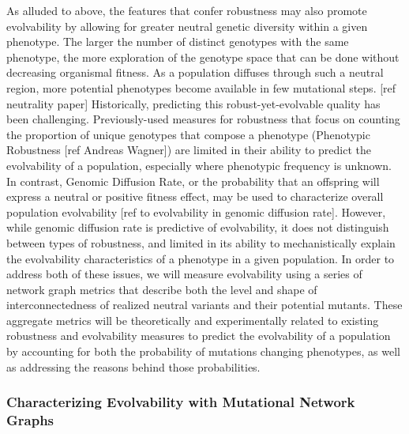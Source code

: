 As alluded to above, the features that confer robustness may also promote evolvability by allowing for greater neutral genetic diversity within a given phenotype. The larger the number of distinct genotypes with the same phenotype, the more exploration of the genotype space that can be done without decreasing organismal fitness. As a population diffuses through such a neutral region, more potential phenotypes become available in few mutational steps. [ref neutrality paper]
Historically, predicting this robust-yet-evolvable quality has been challenging. Previously-used measures for robustness that focus on counting the proportion of unique genotypes that compose a phenotype (Phenotypic Robustness [ref Andreas Wagner]) are limited in their ability to predict the evolvability of a population, especially where phenotypic frequency is unknown. 
In contrast, Genomic Diffusion Rate, or the probability that an offspring will express a neutral or positive fitness effect, may be used to characterize overall population evolvability [ref to evolvability in genomic diffusion rate]. However, while genomic diffusion rate is predictive of evolvability, it does not distinguish between types of robustness, and limited in its ability to mechanistically explain the evolvability characteristics of a phenotype in a given population. 
In order to address both of these issues, we will measure evolvability using a series of network graph metrics that describe both the level and shape of interconnectedness of realized neutral variants and their potential mutants. These aggregate metrics will be theoretically and experimentally related to existing robustness and evolvability measures to predict the evolvability of a population by accounting for both the probability of mutations changing phenotypes, as well as addressing the reasons behind those probabilities.

\subsubsection{Characterizing Evolvability with Mutational Network Graphs}

